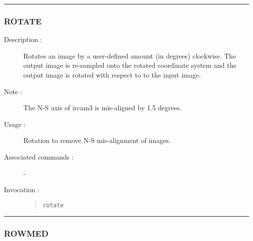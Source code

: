 \hrule
\subsubsection*{\label{ROTATE}ROTATE}

\begin{description}

\item[Description :] Rotates an image by a user-defined amount (in
degrees) clockwise. The output image is re-sampled onto the rotated
coordinate system and the output image is rotated with respect to to
the input image.

\item[Note :] The N-S axis of {\sc ircam3} is mis-aligned by 1.5 degrees.

\item[Usage :] Rotation to remove N-S mis-alignment of images.
\item[Associated commands :] -
\item[Invocation :]

\begin{quote}{\tt  rotate }\end{quote}

\end{description}

\hrule
\subsubsection*{\label{ROWMED}ROWMED}

